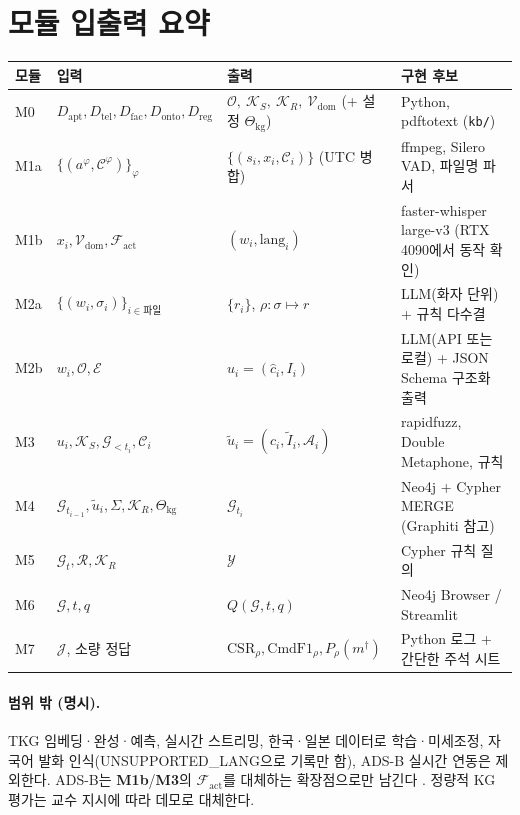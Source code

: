 \documentclass[10pt,a4paper]{article}
\newcommand{\G}{\mathcal{G}}
\newcommand{\KS}{\mathcal{K}_S}
\newcommand{\Ont}{\mathcal{O}}
\newcommand{\Ctx}{\mathcal{C}}
\newcommand{\Yset}{\mathcal{Y}}
\newcommand{\Vdom}{\mathcal{V}_{\mathrm{dom}}}
\newcommand{\KR}{\mathcal{K}_R}
\newcommand{\Cfg}{\Theta_{\mathrm{kg}}}
\newcommand{\cmd}[1]{\textsf{\small #1}}
\newcommand{\md}[1]{\textbf{\textcolor{blue!60!black}{#1}}}
\begin{document}
\section{모듈 입출력 요약}
\begin{center}\small
\begin{tabularx}{\textwidth}{@{}l>{\raggedright\arraybackslash}p{3.3cm}>{\raggedright\arraybackslash}p{3.6cm}>{\raggedright\arraybackslash}X@{}}
\toprule
모듈 & 입력 & 출력 & 구현 후보\\\midrule
M0 & $D_{\mathrm{apt}},D_{\mathrm{tel}},D_{\mathrm{fac}},D_{\mathrm{onto}},D_{\mathrm{reg}}$ & $\Ont,\ \KS,\ \KR,\ \Vdom$ (+ 설정 $\Cfg$) & Python, pdftotext (\texttt{kb/})\\
M1a & $\{(a^{\varphi},\Ctx^{\varphi})\}_{\varphi}$ & $\{(s_i,x_i,\Ctx_i)\}$ (UTC 병합) & ffmpeg, Silero VAD, 파일명 파서\\
M1b & $x_i,\Vdom,\mathcal{F}_{\mathrm{act}}$ & $(w_i,\mathrm{lang}_i)$ & faster-whisper large-v3 (RTX 4090에서 동작 확인)\\
M2a & $\{(w_i,\sigma_i)\}_{i\in\text{파일}}$ & $\{r_i\}$, $\rho:\sigma\mapsto r$ & LLM(화자 단위) + 규칙 다수결\\
M2b & $w_i,\Ont,\mathcal{E}$ & $u_i=(\hat c_i,I_i)$ & LLM(API 또는 로컬) + JSON Schema 구조화 출력\\
M3 & $u_i,\KS,\G_{<t_i},\Ctx_i$ & $\tilde u_i=(c_i,\tilde I_i,\mathcal{A}_i)$ & rapidfuzz, Double Metaphone, 규칙\\
M4 & $\G_{t_{i-1}},\tilde u_i,\Sigma,\KR,\Cfg$ & $\G_{t_i}$ & Neo4j + Cypher MERGE (Graphiti 참고)\\
M5 & $\G_t,\mathcal{R},\KR$ & $\Yset$ & Cypher 규칙 질의\\
M6 & $\G,t,q$ & $Q(\G,t,q)$ & Neo4j Browser / Streamlit\\
M7 & $\mathcal{J}$, 소량 정답 & $\mathrm{CSR}_\rho,\mathrm{CmdF1}_\rho,P_\rho(m^\dagger)$ & Python 로그 + 간단한 주석 시트\\
\bottomrule
\end{tabularx}
\end{center}

\paragraph{범위 밖 (명시).} TKG 임베딩·완성·예측, 실시간 스트리밍, 한국·일본 데이터로 학습·미세조정, 자국어 발화 인식(\cmd{UNSUPPORTED\_LANG}으로 기록만 함), ADS-B 실시간 연동은 제외한다. ADS-B는 \md{M1b}/\md{M3}의 $\mathcal{F}_{\mathrm{act}}$를 대체하는 확장점으로만 남긴다 \cite{nigmatulina2022}. 정량적 KG 평가는 교수 지시에 따라 데모로 대체한다.
\end{document}
